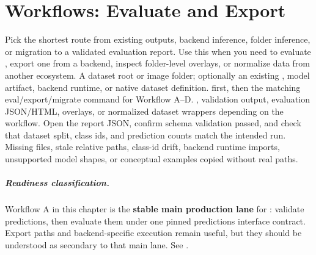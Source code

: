 \chapter{Workflows: Evaluate and Export}
\label{chap:evaluation-workflows}


\WorkflowOpening
{Pick the shortest route from existing outputs, backend inference, folder inference, or migration to a validated evaluation report.}
{Use this when you need to evaluate , export one from a backend, inspect folder-level overlays, or normalize data from another ecosystem.}
{A dataset root or image folder; optionally an existing , model artifact, backend runtime, or native dataset definition.}
{ first, then the matching eval/export/migrate command for Workflow A--D.}
{, validation output, evaluation JSON/HTML, overlays, or normalized dataset wrappers depending on the workflow.}
{Open the report JSON, confirm schema validation passed, and check that dataset split, class ids, and prediction counts match the intended run.}
{Missing files, stale relative paths, class-id drift, backend runtime imports, unsupported model shapes, or conceptual examples copied without real paths.}

\paragraph{Readiness classification.}
Workflow A in this chapter is the \textbf{stable main production lane} for \yolozu{}: validate predictions, then evaluate them under one pinned predictions interface contract.
Export paths and backend-specific execution remain useful, but they should be understood as secondary to that main lane.
See .

